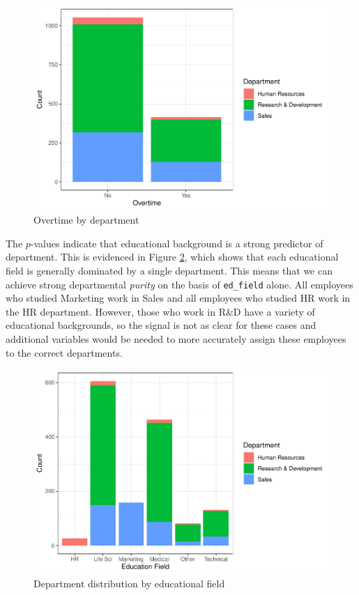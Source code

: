 \documentclass[
]{book}
\begin{document}
\begin{figure}

{\centering \includegraphics[width=1\linewidth]{The_Fundamentals_of_People_Analytics_files/figure-latex/ot-dept-1} 

}

\caption{Overtime by department}\label{fig:ot-dept}
\end{figure}

The \(p\)-values indicate that educational background is a strong predictor of department. This is evidenced in Figure \ref{fig:ed-field-dept}, which shows that each educational field is generally dominated by a single department. This means that we can achieve strong departmental \emph{purity} on the basis of \texttt{ed\_field} alone. All employees who studied Marketing work in Sales and all employees who studied HR work in the HR department. However, those who work in R\&D have a variety of educational backgrounds, so the signal is not as clear for these cases and additional variables would be needed to more accurately assign these employees to the correct departments.

\begin{figure}

{\centering \includegraphics[width=1\linewidth]{The_Fundamentals_of_People_Analytics_files/figure-latex/ed-field-dept-1} 

}

\caption{Department distribution by educational field}\label{fig:ed-field-dept}
\end{figure}
\end{document}
